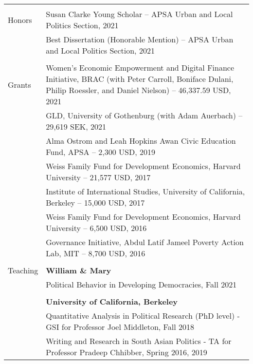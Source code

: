 \documentclass[letterpaper, 11pt]{article}
\begin{document}
\begin{longtable}{p{1in}p{5.5in}}
&\\




{{Honors}} 
& Susan Clarke Young Scholar  -- APSA Urban and Local Politics Section, 2021\\

& Best Dissertation  (Honorable Mention) --  APSA Urban and Local Politics Section, 2021 \\

& \\

{{Grants}} 
& Women's Economic Empowerment and Digital Finance Initiative, BRAC (with Peter Carroll, Boniface Dulani, Philip Roessler, and Daniel Nielson)
 -- 46,337.59 USD, 2021\\



& GLD, University of Gothenburg (with Adam Auerbach)
-- 29,619 SEK, 2021 \\


& Alma Ostrom and Leah Hopkins Awan Civic Education Fund, APSA -- 2,300 USD, 2019\\

& Weiss Family Fund for Development Economics, Harvard University -- 21,577 USD, 2017
\\

&Institute of International Studies, University of California, Berkeley -- 15,000 USD, 2017 \\

&Weiss Family Fund for Development Economics, Harvard University -- 6,500 USD, 2016  \\

&Governance Initiative, Abdul Latif Jameel Poverty Action Lab, MIT -- 8,700 USD, 2016 \\

& \\



{{Teaching}} & \textbf{William \& Mary} \\
&Political Behavior in Developing Democracies, Fall 2021 \\
&\\

& \textbf{University of California, Berkeley}\\
& Quantitative Analysis in Political Research (PhD level) - GSI for Professor Joel Middleton, Fall 2018 \\

& Writing and Research in South Asian Politics - TA for Professor Pradeep Chhibber, Spring 2016, 2019\\


\end{longtable}
\end{document}
